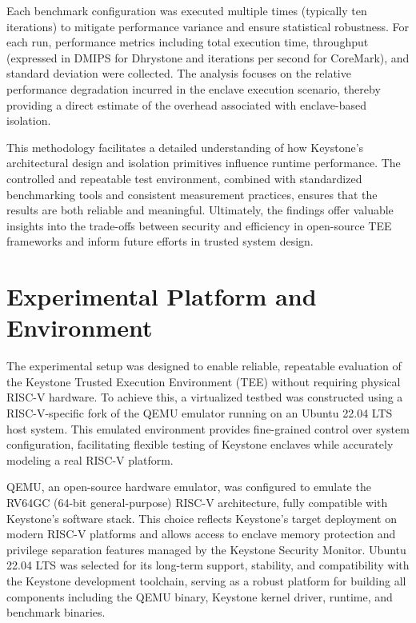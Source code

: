 Each benchmark configuration was executed multiple times (typically ten iterations) to mitigate performance variance and ensure statistical robustness. For each run, performance metrics including total execution time, throughput (expressed in DMIPS for Dhrystone and iterations per second for CoreMark), and standard deviation were collected. The analysis focuses on the relative performance degradation incurred in the enclave execution scenario, thereby providing a direct estimate of the overhead associated with enclave-based isolation.

This methodology facilitates a detailed understanding of how Keystone’s architectural design and isolation primitives influence runtime performance. The controlled and repeatable test environment, combined with standardized benchmarking tools and consistent measurement practices, ensures that the results are both reliable and meaningful. Ultimately, the findings offer valuable insights into the trade-offs between security and efficiency in open-source TEE frameworks and inform future efforts in trusted system design.

\section{Experimental Platform and Environment}
\label{sec:experimental-setup}

The experimental setup was designed to enable reliable, repeatable evaluation of the Keystone Trusted Execution Environment (TEE) without requiring physical RISC-V hardware. To achieve this, a virtualized testbed was constructed using a RISC-V-specific fork of the QEMU emulator running on an Ubuntu 22.04 LTS host system. This emulated environment provides fine-grained control over system configuration, facilitating flexible testing of Keystone enclaves while accurately modeling a real RISC-V platform.

QEMU, an open-source hardware emulator, was configured to emulate the RV64GC (64-bit general-purpose) RISC-V architecture, fully compatible with Keystone’s software stack. This choice reflects Keystone’s target deployment on modern RISC-V platforms and allows access to enclave memory protection and privilege separation features managed by the Keystone Security Monitor. Ubuntu 22.04 LTS was selected for its long-term support, stability, and compatibility with the Keystone development toolchain, serving as a robust platform for building all components including the QEMU binary, Keystone kernel driver, runtime, and benchmark binaries.

